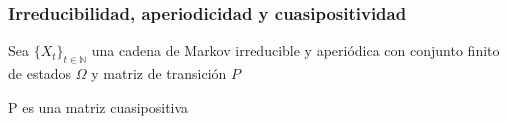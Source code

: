 \begin{frame}
\frametitle{Irreducibilidad, aperiodicidad y cuasipositividad}

{\small

Sea $\{ X_t \}_{t \in \mathbb{N}}$ una cadena de Markov irreducible y aperiódica con conjunto finito de estados $\Omega$ y matriz de transición $P$


\begin{proposition}
P es una matriz cuasipositiva
\end{proposition}



}

\end{frame}
